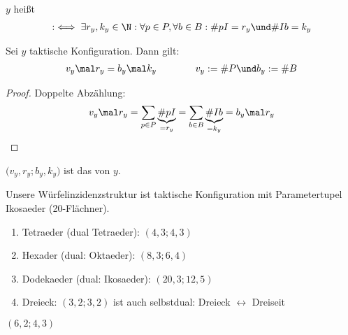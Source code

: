 \begin{definition}
	$y$ heißt 
	\begin{align*}
		:\iff\exists r_y,k_y\in\N:\forall p\in P,\forall b\in B:\# pI=r_y\und\#Ib=k_y
	\end{align*}
\end{definition}

\begin{lemma}
	Sei $y$ taktische Konfiguration. Dann gilt:
	\begin{align*}
		v_y\mal r_y=b_y\mal k_y
		\qquad\mit\qquad
		v_y:=\# P\und b_y:=\#B
	\end{align*}
\end{lemma}

\begin{proof}
	Doppelte Abzählung: 
	\begin{align*}
		v_y\mal r_y=\sum\limits_{p\in P}\underbrace{\# pI}_{=r_y}=\sum\limits_{b\in B}\underbrace{\#Ib}_{=k_y}=b_y\mal r_y
	\end{align*}
\end{proof}


\begin{definition}
	$\big(v_y,r_y;b_y,k_y)$ ist das  von $y$.
\end{definition}

\begin{beispiel}
	Unsere Würfelinzidenzstruktur ist taktische Konfiguration mit Parametertupel Ikosaeder (20-Flächner).
	\begin{enumerate}
		\item Tetraeder (dual Tetraeder): $(4,3;4,3)$ 
		\item Hexader (dual: Oktaeder): $(8,3;6,4)$
		\item Dodekaeder (dual: Ikosaeder): $(20,3;12,5)$
		\item Dreieck: $(3,2;3,2)$ ist auch selbstdual: Dreieck $\leftrightarrow$ Dreiseit
	\end{enumerate}
\end{beispiel}

\begin{beispiel}\enter
	$(6,2;4,3)$

\end{beispiel}

